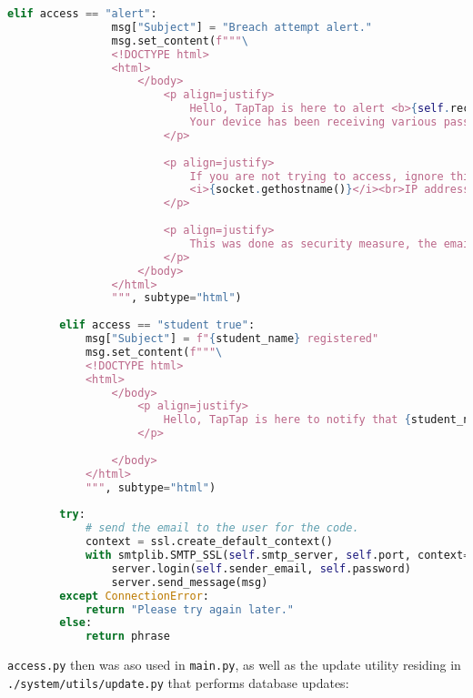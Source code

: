 \documentclass[12pt]{article}
\begin{document}
\begin{lstlisting}[language=Python, caption={\texttt{code\_email.py}}]
			elif access == "alert":
				msg["Subject"] = "Breach attempt alert."  
				msg.set_content(f"""\
				<!DOCTYPE html>
				<html>
					</body>
						<p align=justify>
							Hello, TapTap is here to alert <b>{self.receiver_email} ({self.user}) from {school_name} of possible breach alert.</b><br><br>
							Your device has been receiving various passphrase mismatch. Due to the setup of device, it is shutting down as you receive this email. You can access it later on.
						</p>
					
						<p align=justify> 
							If you are not trying to access, ignore this email. The details of the computer are:<br><br>User: <i>{os.getlogin()}</i><br>HOSTNAME:
							<i>{socket.gethostname()}</i><br>IP address: <i>{socket.gethostbyname(socket.gethostname())}</i><br>Tracked from:<i> {geocoder.ip('me')}) at {datetime.now().strftime('%d/%m/%Y %H:%M:%S')}</i>.
						</p>
					
						<p align=justify>
							This was done as security measure, the email in situation that met the criterion is inevitable.<br><blockquote>Cheers,<br>TapTap team</blockquote>
						</p>
					</body>
				</html>
				""", subtype="html")
			
		elif access == "student true":
			msg["Subject"] = f"{student_name} registered"
			msg.set_content(f"""\
			<!DOCTYPE html>
			<html>
				</body>
					<p align=justify>
						Hello, TapTap is here to notify that {student_name} of {school_name} has finally arrived his class at {datetime.now().strftime('%d/%m/%Y %H:%M:%S')}, and is present in school today. Thank you!
					</p>
				
				</body>
			</html>
			""", subtype="html")            
		
		try:        
			# send the email to the user for the code.         
			context = ssl.create_default_context()
			with smtplib.SMTP_SSL(self.smtp_server, self.port, context=context) as server:    
				server.login(self.sender_email, self.password)
				server.send_message(msg)
		except ConnectionError:
			return "Please try again later."        
		else:	
			return phrase

\end{lstlisting}
\doublespacing

\texttt{access.py} then was aso used in \texttt{main.py}, as well as the update utility residing in \texttt{./system/utils/update.py} that performs database updates:
\end{document}
